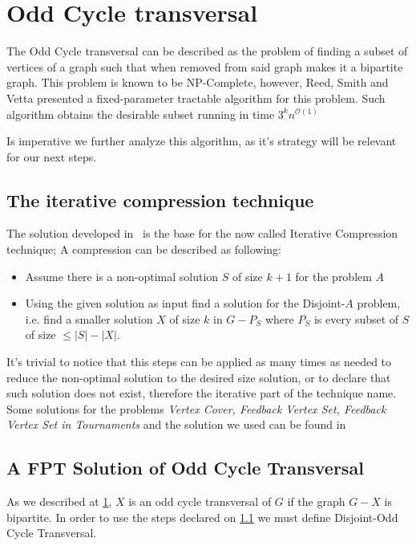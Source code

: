 \section{Odd Cycle transversal}\label{sec:oct}

The Odd Cycle transversal can be described as the problem of finding a subset of vertices of a graph such that when removed from said graph makes it a bipartite graph.
This problem is known to be NP-Complete, however, Reed, Smith and Vetta presented a fixed-parameter tractable algorithm for this problem.
Such algorithm obtains the desirable subset running in time $3^{k}n^{\mathcal{O}(1)}$ \cite{reed-04}

Is imperative we further analyze this algorithm, as it's strategy will be relevant for our next steps.

\subsection{The iterative compression technique}\label{subsec:the-iterative-compression-technique}

The solution developed in~\cite{reed-04} is the base for the now called Iterative Compression technique;
A compression can be described as following:

\begin{itemize}
    \item Assume there is a non-optimal solution $S$ of size $k+1$ for the problem $A$
    \item Using the given solution as input find a solution for the Disjoint-$A$ problem, i.e. find a smaller solution $X$ of size $k$ in $G-P_S$ where $P_S$ is every subset of $S$ of size $ \leq |S| - |X|$.
\end{itemize}


It's trivial to notice that this steps can be applied as many times as needed to reduce the non-optimal solution to the desired size solution,
or to declare that such solution does not exist, therefore the iterative part of the technique name.
Some solutions for the problems \emph{Vertex Cover, Feedback Vertex Set, Feedback Vertex Set in Tournaments} and the solution we used can be found in~\cite{cygan-2015}

\subsection{A FPT Solution of Odd Cycle Transversal}\label{subsec:fpt-solution-oct}

As we described at \ref{sec:oct}, $X$ is an odd cycle transversal of $G$ if the graph $G-X$ is bipartite.
In order to use the steps declared on \ref{subsec:the-iterative-compression-technique} we must define Disjoint-Odd Cycle Transversal.

